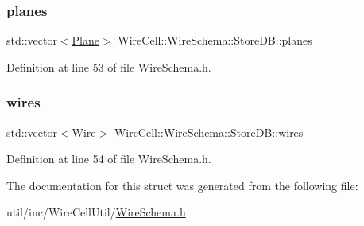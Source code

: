 \subsubsection{\texorpdfstring{planes}{planes}}
{\footnotesize\ttfamily std\+::vector$<$\hyperlink{struct_wire_cell_1_1_wire_schema_1_1_plane}{Plane}$>$ Wire\+Cell\+::\+Wire\+Schema\+::\+Store\+D\+B\+::planes}



Definition at line 53 of file Wire\+Schema.\+h.

\mbox{\label{struct_wire_cell_1_1_wire_schema_1_1_store_d_b_a6cdd13dfbb21a123b54bdd849ed5a4cf}} 
\subsubsection{\texorpdfstring{wires}{wires}}
{\footnotesize\ttfamily std\+::vector$<$\hyperlink{struct_wire_cell_1_1_wire_schema_1_1_wire}{Wire}$>$ Wire\+Cell\+::\+Wire\+Schema\+::\+Store\+D\+B\+::wires}



Definition at line 54 of file Wire\+Schema.\+h.



The documentation for this struct was generated from the following file\+:\begin{DoxyCompactItemize}
\item 
util/inc/\+Wire\+Cell\+Util/\hyperlink{_wire_schema_8h}{Wire\+Schema.\+h}\end{DoxyCompactItemize}
